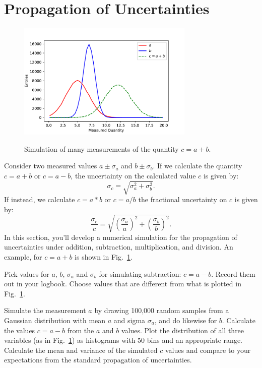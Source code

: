 \section{Propagation of Uncertainties}

\begin{figure}[htbp]
\begin{center}
\includegraphics[width=0.75\textwidth]{figs/labs/uncertainties/addunc.pdf}\\
\end{center}
\caption{\label{fig:addunc} Simulation of many measurements of the quantity $c = a + b$. }
\end{figure}

Consider two measured values $a \pm \sigma_a$ and $b \pm \sigma_b$.  If we calculate the quantity $c = a + b$ or $c = a - b$, the uncertainty on the calculated value $c$ is given by:
\begin{displaymath}
\sigma_c = \sqrt{\sigma_a^2 + \sigma_b^2}.
\end{displaymath}
If instead, we calculate $c = a * b$ or $c = a/b$ the fractional uncertainty on $c$ is given by:
\begin{displaymath}
\frac{\sigma_c}{c} = \sqrt{\left(\frac{\sigma_a}{a}\right)^2 + \left(\frac{\sigma_b}{b}\right)^2}.
\end{displaymath}
In this section, you'll develop a numerical simulation for the
propagation of uncertainties under addition, subtraction,
multiplication, and division.  An example, for $c = a + b$ is shown in Fig.~\ref{fig:addunc}.

Pick values for $a$, $b$, $ \sigma_a$ and $ \sigma_b$ for simulating
subtraction: $c=a-b$. Record them out in your logbook. Choose values
that are different from what is plotted in Fig.~\ref{fig:addunc}.

\begin{plot} 
Simulate the measurement $a$ by drawing 100,000 random samples from a
Gaussian distribution with mean $a$ and sigma $\sigma_a$, and do
likewise for $b$.  Calculate the values $c = a -b $ from the $a$ and
$b$ values.  Plot the distribution of all three variables (as in
Fig.~\ref{fig:addunc}) as histograms with 50 bins and an appropriate
range.  Calculate the mean and variance of the simulated $c$ values
and compare to your expectations from the standard propagation of
uncertainties.
\end{plot} 

